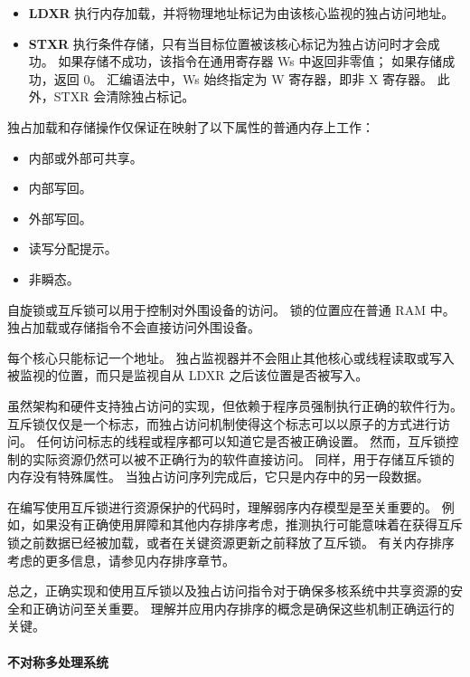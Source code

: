 \begin{itemize}
\item
  \textbf{LDXR}
  执行内存加载，并将物理地址标记为由该核心监视的独占访问地址。
\item
  \textbf{STXR}
  执行条件存储，只有当目标位置被该核心标记为独占访问时才会成功。
  如果存储不成功，该指令在通用寄存器 Ws 中返回非零值；
  如果存储成功，返回 0。
  汇编语法中，Ws 始终指定为 W 寄存器，即非 X 寄存器。
  此外，STXR 会清除独占标记。
\end{itemize}


独占加载和存储操作仅保证在映射了以下属性的普通内存上工作：

\begin{itemize}
\item
  内部或外部可共享。
\item
  内部写回。
\item
  外部写回。
\item
  读写分配提示。
\item
  非瞬态。
\end{itemize}


自旋锁或互斥锁可以用于控制对外围设备的访问。
锁的位置应在普通 RAM 中。
独占加载或存储指令不会直接访问外围设备。

每个核心只能标记一个地址。
独占监视器并不会阻止其他核心或线程读取或写入被监视的位置，而只是监视自从 LDXR 之后该位置是否被写入。


虽然架构和硬件支持独占访问的实现，但依赖于程序员强制执行正确的软件行为。
互斥锁仅仅是一个标志，而独占访问机制使得这个标志可以以原子的方式进行访问。
任何访问标志的线程或程序都可以知道它是否被正确设置。
然而，互斥锁控制的实际资源仍然可以被不正确行为的软件直接访问。
同样，用于存储互斥锁的内存没有特殊属性。
当独占访问序列完成后，它只是内存中的另一段数据。


在编写使用互斥锁进行资源保护的代码时，理解弱序内存模型是至关重要的。
例如，如果没有正确使用屏障和其他内存排序考虑，推测执行可能意味着在获得互斥锁之前数据已经被加载，或者在关键资源更新之前释放了互斥锁。
有关内存排序考虑的更多信息，请参见内存排序章节。

总之，正确实现和使用互斥锁以及独占访问指令对于确保多核系统中共享资源的安全和正确访问至关重要。
理解并应用内存排序的概念是确保这些机制正确运行的关键。

\paragraph{不对称多处理系统}

